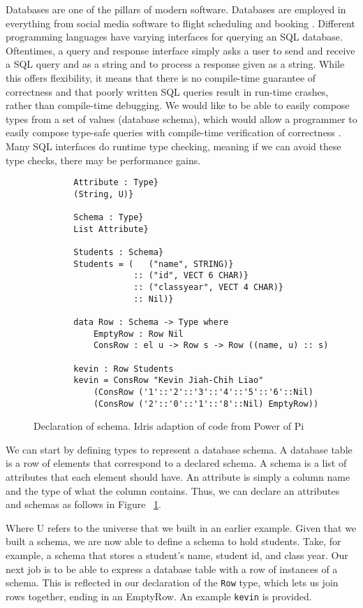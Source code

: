 Databases are one of the pillars of modern software. Databases are employed in
everything from social media software \cite{tao} to flight scheduling and
booking \cite{flights}. Different programming languages have varying interfaces
for querying an SQL database. Oftentimes, a query and response interface simply
asks a user to send and receive a SQL query and as a string and to process a
response given as a string. While this offers flexibility, it means that there
is no compile-time guarantee of correctness and that poorly written SQL queries
result in run-time crashes, rather than compile-time debugging. We would like to
be able to easily compose types from a set of values (database schema), which
would allow a programmer to easily compose type-safe queries with compile-time
verification of correctness \cite{power_of_pi}. Many SQL interfaces do runtime
type checking, meaning if we can avoid these type checks, there may be
performance gains. 

\begin{figure}[h]
    \caption{Declaration of schema. Idris adaption of code from Power of Pi
    \cite{power_of_pi}}
    \label{schema}
    \begin{lstlisting}
        Attribute : Type}
        (String, U)}

        Schema : Type}
        List Attribute}

        Students : Schema}
        Students = (   ("name", STRING)}
                    :: ("id", VECT 6 CHAR)} 
                    :: ("classyear", VECT 4 CHAR)}
                    :: Nil)}

        data Row : Schema -> Type where
            EmptyRow : Row Nil
            ConsRow : el u -> Row s -> Row ((name, u) :: s)

        kevin : Row Students
        kevin = ConsRow "Kevin Jiah-Chih Liao"
            (ConsRow ('1'::'2'::'3'::'4'::'5'::'6'::Nil)
            (ConsRow ('2'::'0'::'1'::'8'::Nil) EmptyRow))
    \end{lstlisting}
\end{figure}

We can start by defining types to represent a database schema. A database table
is a row of elements that correspond to a declared schema. A schema is a list of
attributes that each element should have. An attribute is simply a column name
and the type of what the column contains. Thus, we can declare an attributes and
schemas as follows in Figure ~\ref{schema}. 


Where U refers to the universe that we built in an earlier example. Given that
we built a schema, we are now able to define a schema to hold students. Take,
for example, a schema that stores a student's name, student id, and class year.
Our next job is to be able to express a database table with a row of instances
of a schema. This is reflected in our declaration of the \texttt{Row} type,
which lets us join rows together, ending in an EmptyRow. An example
\texttt{kevin} is provided. 

